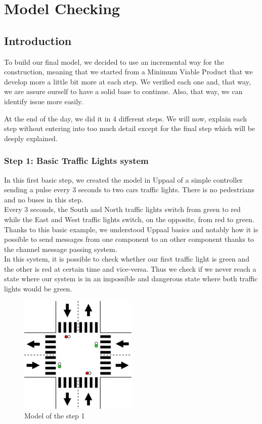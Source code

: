\section{Model Checking}
\subsection{Introduction}
To build our final model, we decided to use an incremental way for the construction, meaning that we started from a Minimum Viable Product that we develop more a little bit more at each step. We  verified each one and, that way, we are assure ourself to have a solid base to continue. Also, that way, we can identify issue more easily.

At the end of the day, we did it in 4 different steps. We will now, explain each step without entering into too much detail except for the final step which will be deeply explained.

\subsubsection{Step 1: Basic Traffic Lights system}
In this first basic step, we created the model in Uppaal of a simple controller sending a pulse every 3 seconds to two cars traffic lights. There is no pedestrians and no buses in this step. \\
Every 3 seconds, the South and North traffic lights switch from green to red while the East and West traffic lights switch, on the opposite, from red to green. \\

Thanks to this basic example, we understood Uppaal basics and notably how it is possible to send messages from one component to an other component thanks to the channel message passing system. \\

In this system, it is possible to check whether our first traffic light is green and the other is red at certain time and vice-versa. Thus we check if we never reach a state where our system is in an impossible and dangerous state where both traffic lights would be green.


\begin{figure}[H]\label{fig:step1}
  \centering
    \includegraphics[width=0.5\textwidth]{picture/model/trafficlight_step1_s1.png}
    \caption{Model of the step 1}
\end{figure}


